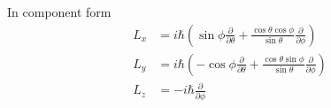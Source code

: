 In component form
\begin{align*}
L_x&=i\hbar\left(\sin\phi\frac{\partial}{\partial\theta}
+\frac{\cos\theta\cos\phi}{\sin\theta}\frac{\partial}{\partial\phi}\right)
\\[1ex]
L_y&=i\hbar\left(-\cos\phi\frac{\partial}{\partial\theta}
+\frac{\cos\theta\sin\phi}{\sin\theta}\frac{\partial}{\partial\phi}\right)
\\[1ex]
L_z&=-i\hbar\frac{\partial}{\partial\phi}
\end{align*}


